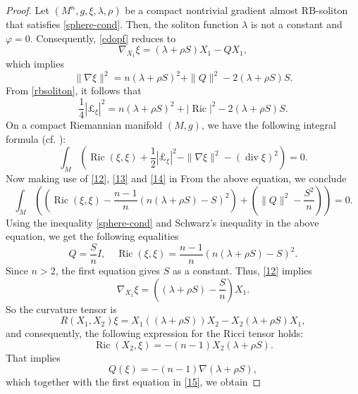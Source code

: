 \documentclass[a4paper, twoside, 10pt]{article}
\numberwithin{equation}{section}
\theoremstyle{definition}
\begin{document}
\begin{proof}
Let $(M^n, g, \xi, \lambda,\rho)$ be a compact nontrivial gradient almost RB-soliton that satisfies \eqref{sphere-cond}.
Then, the soliton function $\lambda$ is not a constant and $\varphi=0$. Consequently, \eqref{cdopf} reduces to
\begin{equation}\label{12}
    \nabla_{X_1} \xi=(\lambda +\rho S) X_1-Q X_1,
\end{equation}
which implies
\begin{equation}\label{13}
 \|\nabla \xi\|^{2}=n (\lambda +\rho S)^{2}+\|Q\|^{2}-2 (\lambda +\rho S) S .   
\end{equation}
From  \eqref{rbsoliton}, it  follows that
\begin{equation}\label{14}
    \frac{1}{4}\left|\pounds_{\xi}\right|^{2}=n (\lambda +\rho S)^{2}+\mid \operatorname{Ric}\left.\right|^{2}-2 (\lambda+\rho S) S.
\end{equation}
On a compact Riemannian manifold $(M, g)$, we have the following integral formula (cf. \cite{YANO}):
\[
\int_{M}\left(\operatorname{Ric}(\xi, \xi)+\frac{1}{2}\left|\pounds_{\xi}\right|^{2}-\|\nabla \xi\|^{2}-(\operatorname{div} \xi)^{2}\right)=0.
\]
Now making use of \eqref{12}, \eqref{13} and \eqref{14} in 
 From the above equation, we conclude
$$
\int_{M}\left(\left(\operatorname{Ric}(\xi, \xi)-\frac{n-1}{n}(n (\lambda +\rho S)-S)^{2}\right)+\left(\|Q\|^{2}-\frac{S^{2}}{n}\right)\right)=0 .
$$
Using the inequality \eqref{sphere-cond} and Schwarz's inequality in the above equation, we get the following equalities
\begin{equation}\label{15}
    Q=\frac{S}{n} I, \quad \operatorname{Ric}(\xi, \xi)=\frac{n-1}{n}(n (\lambda +\rho S)-S)^{2} .
\end{equation}
Since $n>2$, the first equation gives $S$ as a constant. Thus,  \eqref{12} implies
\begin{equation}\label{16}
    \nabla_{X_1} \xi=\left((\lambda +\rho S)-\frac{S}{n}\right) X_1.
\end{equation}
So the curvature tensor is
$$
R(X_1, X_2) \xi=X_1((\lambda+\rho S)) X_2-X_2(\lambda +\rho S) X_1,
$$
and consequently, the following expression for the Ricci tensor
holds:
$$
\operatorname{Ric}(X_2, \xi)=-(n-1) X_2(\lambda+\rho S) .
$$
That implies
$$
Q(\xi)=-(n-1) \nabla (\lambda +\rho S),
$$
which together with the first equation in \eqref{15}, we obtain 

\end{proof}
\end{document}
